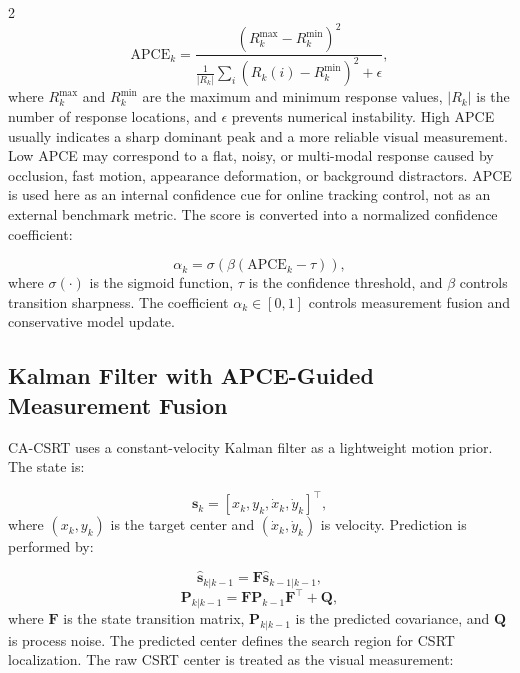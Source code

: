 \documentclass[10pt,a4paper]{article}
\begin{document}
\begin{multicols}{2}
\begin{equation}
\mathrm{APCE}_k =
\frac{\left(R_k^{\max}-R_k^{\min}\right)^2}
{\frac{1}{|R_k|}\sum_i \left(R_k(i)-R_k^{\min}\right)^2 + \epsilon},
\end{equation}
where $R_k^{\max}$ and $R_k^{\min}$ are the maximum and minimum response values, $|R_k|$ is the number of response locations, and $\epsilon$ prevents numerical instability. High APCE usually indicates a sharp dominant peak and a more reliable visual measurement. Low APCE may correspond to a flat, noisy, or multi-modal response caused by occlusion, fast motion, appearance deformation, or background distractors. APCE is used here as an internal confidence cue for online tracking control, not as an external benchmark metric. The score is converted into a normalized confidence coefficient:

\begin{equation}
\alpha_k = \sigma\left(\beta(\mathrm{APCE}_k-\tau)\right),
\end{equation}
where $\sigma(\cdot)$ is the sigmoid function, $\tau$ is the confidence threshold, and $\beta$ controls transition sharpness. The coefficient $\alpha_k \in [0,1]$ controls measurement fusion and conservative model update.

\subsection{Kalman Filter with APCE-Guided Measurement Fusion}

CA-CSRT uses a constant-velocity Kalman filter as a lightweight motion prior. The state is:

\begin{equation}
\mathbf{s}_k = [x_k, y_k, \dot{x}_k, \dot{y}_k]^{\top},
\end{equation}
where $(x_k,y_k)$ is the target center and $(\dot{x}_k,\dot{y}_k)$ is velocity. Prediction is performed by:

\begin{equation}
\hat{\mathbf{s}}_{k|k-1} = \mathbf{F}\hat{\mathbf{s}}_{k-1|k-1},
\end{equation}
\begin{equation}
\mathbf{P}_{k|k-1} = \mathbf{F}\mathbf{P}_{k-1}\mathbf{F}^{\top} + \mathbf{Q},
\end{equation}
where $\mathbf{F}$ is the state transition matrix, $\mathbf{P}_{k|k-1}$ is the predicted covariance, and $\mathbf{Q}$ is process noise. The predicted center defines the search region for CSRT localization. The raw CSRT center is treated as the visual measurement:


\end{multicols}
\end{document}

